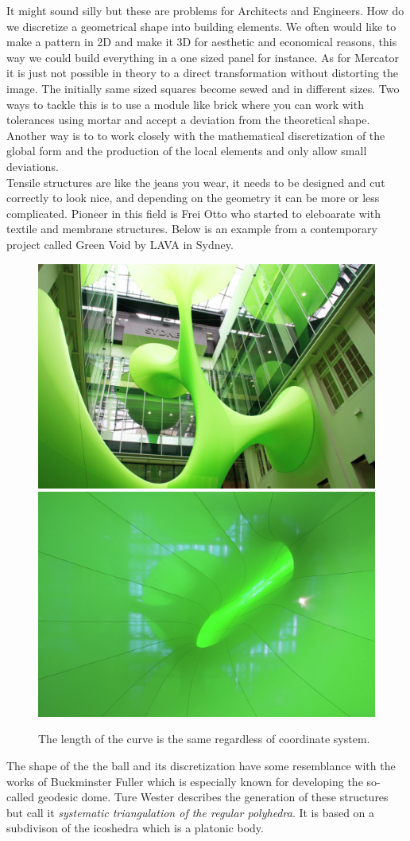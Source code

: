It might sound silly but these are problems for Architects and Engineers. How do we discretize a geometrical shape into building elements. We often would like to make a pattern in 2D and make it 3D for aesthetic and economical reasons, this way we could build everything in a one sized panel for instance. As for Mercator it is just not possible in theory to a direct transformation without distorting the image. The initially same sized squares become sewed and in different sizes.
Two ways to tackle this is to use a module like brick where you can work with tolerances using mortar and accept a deviation from the theoretical shape. Another way is to to work closely with the mathematical discretization of the global form and the production of the local elements and only allow small deviations. \\
Tensile structures are like the jeans you wear, it needs to be designed and cut correctly to look nice, and depending on the geometry it can be more or less complicated. Pioneer in this field is Frei Otto who started to eleboarate with textile and membrane structures. Below is an example from a contemporary project called Green Void by LAVA in Sydney.

\begin{figure}[H]
\centering
\includegraphics[height=0.30\linewidth ]{figure/Introduction/GreenVoid2.jpg}
\includegraphics[height=0.30\linewidth ]{figure/Introduction/GreenVoid1.jpg}
\caption{The length of the curve is the same regardless of coordinate system.}
\end{figure}

The shape of the the ball and its discretization have some resemblance with the works of Buckminster Fuller which is especially known for developing the so-called geodesic dome. Ture Wester describes the generation of these structures but call it \textit{systematic triangulation of the regular polyhedra}. It is based on a subdivison of the icoshedra which is a platonic body.

